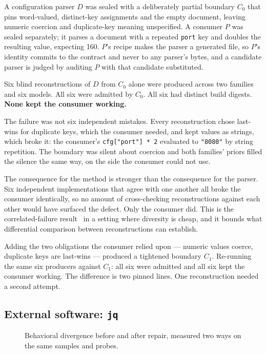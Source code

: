 \documentclass[10pt,twocolumn]{article}
\begin{document}
A configuration parser $D$ was sealed with a deliberately partial
boundary $C_0$ that pins word-valued, distinct-key assignments and the
empty document, leaving numeric coercion and duplicate-key meaning
unspecified. A consumer $P$ was sealed separately; it parses a document
with a repeated \texttt{port} key and doubles the resulting value,
expecting 160. $P$'s recipe makes the parser a generated file, so $P$'s
identity commits to the contract and never to any parser's bytes, and a
candidate parser is judged by auditing $P$ with that candidate
substituted.

Six blind reconstructions of $D$ from $C_0$ alone were produced across
two families and six models. All six were admitted by $C_0$. All six had
distinct build digests. \textbf{None kept the consumer working.}

The failure was not six independent mistakes. Every reconstruction chose
last-wins for duplicate keys, which the consumer needed, and kept values
as strings, which broke it: the consumer's \texttt{cfg["port"] * 2}
evaluated to \texttt{"8080"} by string repetition. The boundary was
silent about coercion and both families' priors filled the silence the
same way, on the side the consumer could not use.

The consequence for the method is stronger than the consequence for the
parser. Six independent implementations that agree with one another all
broke the consumer identically, so no amount of cross-checking
reconstructions against each other would have surfaced the defect. Only
the consumer did. This is the correlated-failure
result~\cite{knight1986} in a setting where diversity is cheap, and it
bounds what differential comparison between reconstructions can
establish.

Adding the two obligations the consumer relied upon --- numeric values
coerce, duplicate keys are last-wins --- produced a tightened boundary
$C_1$. Re-running the same six producers against $C_1$: all six were
admitted and all six kept the consumer working. The difference is two
pinned lines. One reconstruction needed a second attempt.

\subsection{External software: \texttt{jq}}
\label{sec:jq}

\begin{figure}[t]
\centering

\caption{Behavioral divergence before and after repair, measured two ways
on the same samples and probes.}
\label{fig:divergence}
\end{figure}
\end{document}
